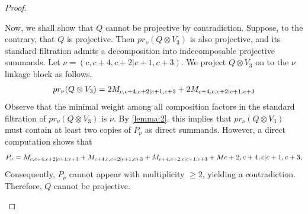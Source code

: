\begin{proof}
\begin{enumerate}
\begin{enumerate}
Now, we shall show that $Q$ cannot be projective by contradiction.
Suppose, to the contrary, that $Q$ is projective. Then $pr_\nu(Q \otimes V_3)$ is also projective, and its standard filtration admits a decomposition into indecomposable projective summands.
Let $\nu = (c,c+4,c+2|c+1,c+3)$. We project $Q \otimes V_3$ on to the $\nu$ linkage block as follows.
\begin{equation}\notag
  \begin{aligned}
    pr_\nu(Q \otimes V_3) = 2M_{c,c+4,c+2|c+1,c+3} + 2M_{c+4,c,c+2|c+1,c+3}
  \end{aligned}
\end{equation}
Observe that the minimal weight among all composition factors in the standard filtration of $pr_\nu(Q \otimes V_3)$ is $\nu$. By \cref{lemma:2}, this implies that $pr_\nu(Q \otimes V_3)$ must contain at least two copies of $P_\nu$ as direct summands. However, a direct computation shows that
  \begin{equation}\notag
    \begin{aligned}
  P_\nu = M_{c,c+4,c+2|c+1,c+3} + M_{c+4,c,c+2|c+1,c+3} + M_{c+4,c+2,c|c+1,c+3} + M{c+2,c+4,c|c+1,c+3},
    \end{aligned}
  \end{equation}
Consequently, $P_\nu$ cannot appear with multiplicity $\geq 2$, yielding a contradiction. Therefore, $Q$ cannot be projective.


\end{enumerate}
\end{enumerate}
\end{proof}
